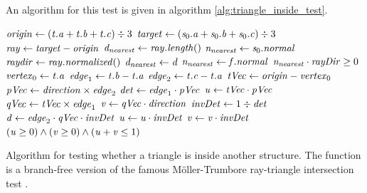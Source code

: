 An algorithm for this  test is given in algorithm \ref{alg:triangle_inside_test}. 
%
\begin{algorithm}
	\centering
	\begin{algorithmic}[1]
			\State $\mathit{origin} \gets (\mathit{t}.\mathit{a} + \mathit{t}.\mathit{b} + \mathit{t}.\mathit{c}) \div 3$ 
			\State $\mathit{target} \gets (\mathit{s}_0.\mathit{a} + \mathit{s}_0.\mathit{b} + \mathit{s}_0.\mathit{c}) \div 3$ 
			\State $\mathit{ray} \gets \mathit{target} - \mathit{origin}$
			\State $\mathit{d}_{\mathit{nearest}} \gets \mathit{ray}.\mathit{length}()$
			\State $\mathit{n}_{\mathit{nearest}} \gets \mathit{s}_0.\mathit{normal}$
			\State $\mathit{raydir} \gets \mathit{ray}.\mathit{normalized}()$
			 
						\State $\mathit{d}_{\mathit{nearest}} \gets \mathit{d}$
						\State $\mathit{n}_{\mathit{nearest}} \gets \mathit{f}.\mathit{normal}$
					\EndIf
				\EndIf
			\EndFor
			\State \Return $\mathit{n}_{\mathit{nearest}} \cdot \mathit{rayDir} \geq 0$
		\EndFunction
		\\
			\State $\mathit{vertex}_0 \gets \mathit{t}.\mathit{a}$
			\State $\mathit{edge}_1 \gets \mathit{t}.\mathit{b} - \mathit{t}.\mathit{a}$
			\State $\mathit{edge}_2 \gets \mathit{t}.\mathit{c} - \mathit{t}.\mathit{a}$
			\State $\mathit{tVec} \gets \mathit{origin} - \mathit{vertex}_0$
			\State $\mathit{pVec} \gets \mathit{direction} \times \mathit{edge}_2$
			\State $\mathit{det} \gets \mathit{edge}_1 \cdot \mathit{pVec}$
			\State $\mathit{u} \gets \mathit{tVec} \cdot \mathit{pVec}$
			\State $\mathit{qVec} \gets \mathit{tVec} \times \mathit{edge}_1$
			\State $\mathit{v} \gets \mathit{qVec} \cdot \mathit{direction}$
			\State $\mathit{invDet} \gets 1 \div \mathit{det}$
			\State $\mathit{d} \gets \mathit{edge}_2 \cdot \mathit{qVec} \cdot \mathit{invDet}$
			\State $\mathit{u} \gets \mathit{u} \cdot \mathit{invDet}$
			\State $\mathit{v} \gets \mathit{v} \cdot \mathit{invDet}$
			\State \Return $(\mathit{u} \geq 0) \wedge (\mathit{v} \geq 0) \wedge (\mathit{u} + \mathit{v} \leq 1)$
		\EndFunction
	\end{algorithmic}
	\caption{
		Algorithm for testing whether a triangle is inside another structure.
		The  function is a branch-free version of the famous Möller-Trumbore ray-triangle intersection test \cite{ray_triangle_intersection_moller}.
	}
	\label{alg:triangle_inside_test}
\end{algorithm}
